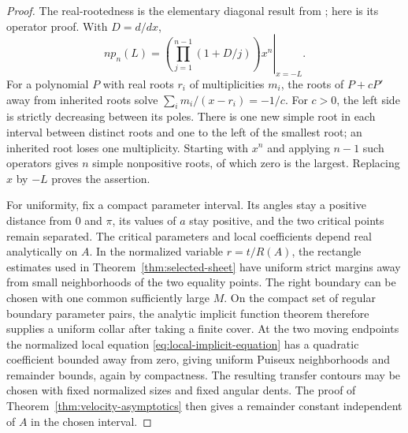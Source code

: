 \documentclass[11pt]{article}
\numberwithin{equation}{section}
\theoremstyle{definition}
\theoremstyle{remark}
\begin{document}
\begin{proof}
The real-rootedness is the elementary diagonal result from
\cite{HarmonicBaseline}; here is its operator proof.  With $D=d/dx$,
\[
 n p_n(L)=
 \left.\left(\prod_{j=1}^{n-1}(1+D/j)\right)x^n\right|_{x=-L}.
\]
For a polynomial $P$ with real roots $r_i$ of multiplicities $m_i$,
the roots of $P+cP'$ away from inherited roots solve
$\sum_i m_i/(x-r_i)=-1/c$.  For $c>0$, the left side is strictly
decreasing between its poles.  There is one new simple root in each
interval between distinct roots and one to the left of the smallest
root; an inherited root loses one multiplicity.  Starting with $x^n$
and applying $n-1$ such operators gives $n$ simple nonpositive roots,
of which zero is the largest.  Replacing $x$ by $-L$ proves the assertion.

For uniformity, fix a compact parameter interval.  Its angles stay a
positive distance from $0$ and $\pi$, its values of $a$ stay positive,
and the two critical points remain separated.  The critical parameters
and local coefficients depend real analytically on $A$.  In the
normalized variable $r=t/R(A)$, the rectangle estimates used in
Theorem~\ref{thm:selected-sheet} have uniform strict margins away from
small neighborhoods of the two equality points.  The right boundary
can be chosen with one common sufficiently large $M$.  On the compact
set of regular boundary parameter pairs, the analytic implicit function
theorem therefore supplies a uniform collar after taking a finite cover.
At the two moving endpoints the normalized local equation
\eqref{eq:local-implicit-equation} has a quadratic coefficient bounded
away from zero, giving uniform Puiseux neighborhoods and remainder
bounds, again by compactness.  The resulting transfer contours may be
chosen with fixed normalized sizes and fixed angular dents.  The proof
of Theorem~\ref{thm:velocity-asymptotics} then gives a remainder constant
independent of $A$ in the chosen interval.
\end{proof}
\end{document}
